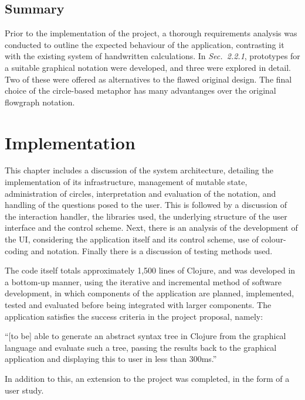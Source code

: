 \documentclass[12pt,twoside,notitlepage,xetex]{report}
\begin{document}
\section{Summary}

Prior to the implementation of the project, a thorough requirements analysis was conducted to outline the expected behaviour of the application, contrasting it with the existing system of handwritten calculations.  In \emph{Sec.~2.2.1}, prototypes for a suitable graphical notation were developed, and three were explored in detail.  Two of these were offered as alternatives to the flawed original design.  The final choice of the circle-based metaphor has many advantanges over the original flowgraph notation.

\cleardoublepage
\chapter{Implementation}

This chapter includes a discussion of the system architecture, detailing the implementation of its infrastructure, management of mutable state, administration of circles, interpretation and evaluation of the notation, and handling of the questions posed to the user.  This is followed by a discussion of the interaction handler, the libraries used, the underlying structure of the user interface and the control scheme.  Next, there is an analysis of the development of the UI, considering the application itself and its control scheme, use of colour-coding and notation.  Finally there is a discussion of testing methods used.

The code itself totals approximately 1,500 lines of Clojure, and was developed in a bottom-up manner, using the iterative and incremental method of software development, in which components of the application are planned, implemented, tested and evaluated before being integrated with larger components.  The application satisfies the success criteria in the project proposal, namely:
\begin{center}
\parbox[c]{\textwidth-2cm}{
\small
``[to be] able to generate an abstract syntax tree in Clojure from the graphical language and evaluate such a tree, passing the results back to the graphical application and displaying this to user in less than 300ms.''
}
\end{center}
In addition to this, an extension to the project was completed, in the form of a user study.
\end{document}
